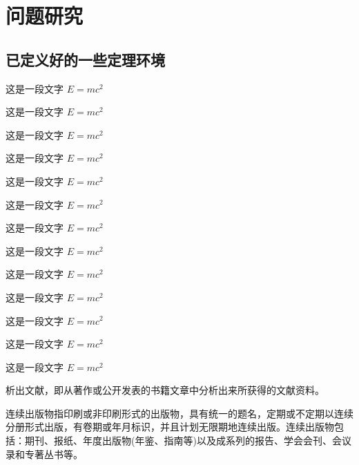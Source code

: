 \chapter{问题研究}


\section{已定义好的一些定理环境}


\begin{definition}
  这是一段文字 $E = m c^2$
\end{definition}

\begin{theorem}
  这是一段文字 $E = m c^2$
\end{theorem}

\begin{example}
  这是一段文字 $E = m c^2$
\end{example}

\begin{property}
  这是一段文字 $E = m c^2$
\end{property}

\begin{proposition}
  这是一段文字 $E = m c^2$
\end{proposition}

\begin{corollary}
  这是一段文字 $E = m c^2$
\end{corollary}

\begin{lemma}
  这是一段文字 $E = m c^2$
\end{lemma}

\begin{axiom}
  这是一段文字 $E = m c^2$
\end{axiom}

\begin{antiexample}
  这是一段文字 $E = m c^2$
\end{antiexample}

\begin{conjecture}
  这是一段文字 $E = m c^2$
\end{conjecture}

\begin{question}
  这是一段文字 $E = m c^2$
\end{question}

\begin{claim}
  这是一段文字 $E = m c^2$
\end{claim}

\begin{remark}
  这是一段文字 $E = m c^2$
\end{remark}

析出文献，即从著作或公开发表的书籍文章中分析出来所获得的文献资料。

连续出版物指印刷或非印刷形式的出版物，具有统一的题名，定期或不定期以连续分册形式出版，有卷期或年月标识，并且计划无限期地连续出版。连续出版物包括：期刊、报纸、年度出版物(年鉴、指南等)以及成系列的报告、学会会刊、会议录和专著丛书等。
\parencite{李晓东,Ahn,丁文祥,张启发,雷光春,邱泽奇,zhang,唐绪军,昂温,Foth,杨国枢,Morison,张志祥,Aldemita,张凯军,Kosek,文献编写,国防白皮,federal,health,江向东,萧钮,PACS-L}
